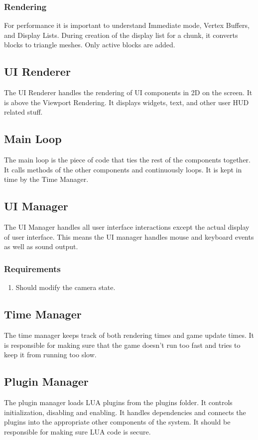 \documentclass{article}
\begin{document}
\subsubsection{Rendering}
For performance it is important to understand Immediate mode, Vertex Buffers, and Display Lists.  During creation of the display list for a chunk, it converts blocks to triangle meshes.  Only active blocks are added.

\subsection{UI Renderer}
The UI Renderer handles the rendering of UI components in 2D on the screen.  It is above the Viewport Rendering.  It displays widgets, text, and other user HUD related stuff.
\subsection{Main Loop}
The main loop is the piece of code that ties the rest of the components together.  It calls methods of the other components and continuously loops.  It is kept in time by the Time Manager.
\subsection{UI Manager}
The UI Manager handles all user interface interactions except the actual display of user interface.  This means the UI manager handles mouse and keyboard events as well as sound output.

\subsubsection{Requirements}
\begin{enumerate}
\item
Should modify the camera state.
\end{enumerate}

\subsection{Time Manager}
The time manager keeps track of both rendering times and game update times.  It is responsible for making sure that the game doesn't run too fast and tries to keep it from running too slow.
\subsection{Plugin Manager}
The plugin manager loads LUA plugins from the plugins folder.  It controls initialization, disabling and enabling.  It handles dependencies and connects the plugins into the appropriate other components of the system.  It should be responsible for making sure LUA code is secure.
\end{document}
